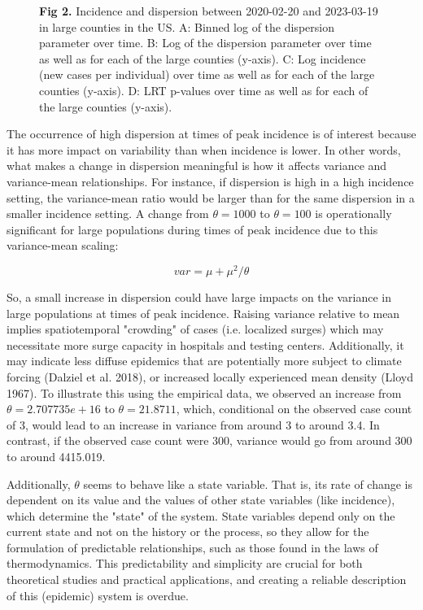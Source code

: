 \documentclass[10pt,letterpaper]{article}
\begin{document}
\begin{figure}[!h]
\caption{{\bf Fig 2.}
Incidence and dispersion between 2020-02-20 and 2023-03-19 in large counties in the US. A: Binned log of the dispersion parameter over time. B: Log of the dispersion parameter over time as well as for each of the large counties (y-axis). C: Log incidence (new cases per individual) over time as well as for each of the large counties (y-axis). D: LRT p-values over time as well as for each of the large counties (y-axis).
}
\label{fig2}
\end{figure}

The occurrence of high dispersion at times of peak incidence is of interest because it has more impact on variability than when incidence is lower. In other words, what makes a change in dispersion meaningful is how it affects variance and variance-mean relationships. For instance, if dispersion is high in a high incidence setting, the variance-mean ratio would be larger than for the same dispersion in a smaller incidence setting. A change from $\theta = 1000$ to $\theta = 100$ is operationally significant for large populations during times of peak incidence due to this variance-mean scaling:

$$var = \mu + \mu^2/\theta$$

So, a small increase in dispersion could have large impacts on the variance in large populations at times of peak incidence. Raising variance relative to mean implies spatiotemporal "crowding" of cases (i.e. localized surges) which may necessitate more surge capacity in hospitals and testing centers. Additionally, it may indicate less diffuse epidemics that are potentially more subject to climate forcing (Dalziel et al. 2018), or increased locally experienced mean density (Lloyd 1967). To illustrate this using the empirical data, we observed an increase from $\theta = 2.707735e+16$ to $\theta = 21.8711$, which, conditional on the observed case count of 3, would lead to an increase in variance from around 3 to around 3.4. In contrast, if the observed case count were 300, variance would go from around 300 to around 4415.019.

Additionally, $\theta$ seems to behave like a state variable. That is, its rate of change is dependent on its value and the values of other state variables (like incidence), which determine the "state" of the system. State variables depend only on the current state and not on the history or the process, so they allow for the formulation of predictable relationships, such as those found in the laws of thermodynamics. This predictability and simplicity are crucial for both theoretical studies and practical applications, and creating a reliable description of this (epidemic) system is overdue.
\end{document}
